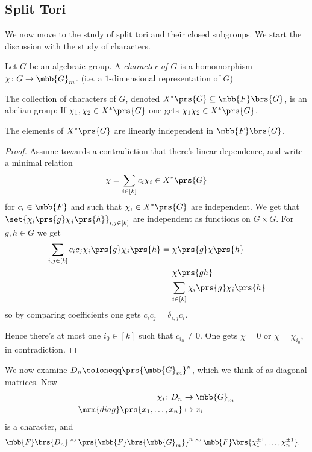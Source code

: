 \documentclass[10pt,a4paper,twoside,openany,hidelinks]{book}
\begin{document}
\subsection{Split Tori}

We now move to the study of split tori and their closed subgroups.
We start the discussion with the study of characters.

\begin{definition}[Character]
Let $G$ be an algebraic group. A \emph{character of $G$} is a homomorphism $\chi \colon G \to \mbb{G}_m$. (i.e. a $1$-dimensional representation of $G$)
\end{definition}

The collection of characters of $G$, denoted $X^*\prs{G} \subseteq \mbb{F}\brs{G}$, is an abelian group:
If $\chi_1, \chi_2 \in X^*\prs{G}$ one gets $\chi_1 \chi_2 \in X^*\prs{G}$.

\begin{proposition}[Dedekind]
The elements of $X^*\prs{G}$ are linearly independent in $\mbb{F}\brs{G}$.
\end{proposition}

\begin{proof}
Assume towards a contradiction that there's linear dependence, and write a minimal relation
\[\chi = \sum_{i \in [k]} c_i \chi_i \in X^*\prs{G}\]
for $c_i \in \mbb{F}$ and such that $\chi_i \in X^*\prs{G}$ are independent.
We get that
$\set{\chi_i\prs{g} \chi_j\prs{h}}_{i,j \in [k]}$ are independent as functions on $G \times G$.
For $g,h \in G$ we get
\begin{align*}
\sum_{i,j \in [k]} c_i c_j \chi_i\prs{g} \chi_j\prs{h}
&=
\chi\prs{g} \chi\prs{h} \\&= \chi\prs{gh} 
\\&= \sum_{i \in [k]} \chi_i \prs{g} \chi_i\prs{h}
\end{align*}
so by comparing coefficients one gets $c_i c_j = \delta_{i,j} c_i$.

Hence there's at most one $i_0 \in [k]$ such that $c_{i_0} \neq 0$. One gets $\chi = 0$ or $\chi = \chi_{i_0}$, in contradiction.
\end{proof}

We now examine $D_n \coloneqq \prs{\mbb{G}_m}^n$, which we think of as diagonal matrices.
Now
\begin{align*}
\chi_i \colon D_n &\to \mbb{G}_m \\
\mrm{diag}\prs{x_1, \ldots, x_n} &\mapsto x_i
\end{align*}
is a character, and
\begin{align*}
\mbb{F}\brs{D_n} &\cong \prs{\mbb{F}\brs{\mbb{G}_m}}^n \cong \mbb{F}\brs{\chi_1^{\pm 1}, \ldots, \chi_n^{\pm 1}} \text{.}
\end{align*}
\end{document}
